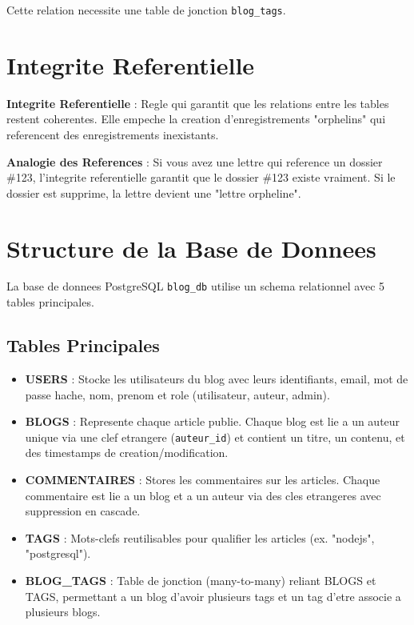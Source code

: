 \documentclass[a4paper,12pt]{book}
\begin{document}
Cette relation necessite une table de jonction \texttt{blog\_tags}.

\section{Integrite Referentielle}

\begin{definitionbox}
    \textbf{Integrite Referentielle} : Regle qui garantit que les relations entre les tables restent coherentes. Elle empeche la creation d'enregistrements "orphelins" qui referencent des enregistrements inexistants.
\end{definitionbox}

\begin{analogybox}
    \textbf{Analogie des References} : Si vous avez une lettre qui reference un dossier \#123, l'integrite referentielle garantit que le dossier \#123 existe vraiment. Si le dossier est supprime, la lettre devient une "lettre orpheline".
\end{analogybox}

\section{Structure de la Base de Donnees}

La base de donnees PostgreSQL \texttt{blog_db} utilise un schema relationnel avec 5 tables principales.

\subsection{Tables Principales}

\begin{itemize}
    \item \textbf{USERS} : Stocke les utilisateurs du blog avec leurs identifiants, email, mot de passe hache, nom, prenom et role (utilisateur, auteur, admin).
    \item \textbf{BLOGS} : Represente chaque article publie. Chaque blog est lie a un auteur unique via une clef etrangere (\texttt{auteur\_id}) et contient un titre, un contenu, et des timestamps de creation/modification.
    \item \textbf{COMMENTAIRES} : Stores les commentaires sur les articles. Chaque commentaire est lie a un blog et a un auteur via des cles etrangeres avec suppression en cascade.
    \item \textbf{TAGS} : Mots-clefs reutilisables pour qualifier les articles (ex. "nodejs", "postgresql").
    \item \textbf{BLOG\_TAGS} : Table de jonction (many-to-many) reliant BLOGS et TAGS, permettant a un blog d'avoir plusieurs tags et un tag d'etre associe a plusieurs blogs.
\end{itemize}
\end{document}
